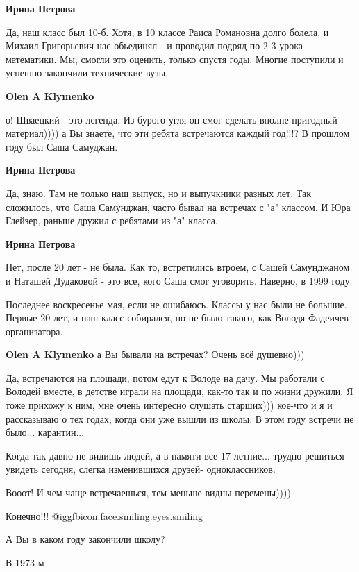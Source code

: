 \textbf{Ирина Петрова} 

Да, наш класс был 10-б. Хотя, в 10 классе Раиса Романовна долго болела, и
Михаил Григорьевич нас обьединял - и проводил подряд по 2-3 урока математики. Мы, 
смогли это оценить, только спустя годы. Многие поступили и успешно закончили
технические вузы.

\textbf{Olen A Klymenko} 

о! Шваецкий - это легенда. Из бурого угля он смог сделать вполне пригодный
материал)))) а Вы знаете, что эти ребята встречаются каждый год!!!? В прошлом
году был Саша Самуджан.

\textbf{Ирина Петрова} 

Да, знаю. Там не только наш выпуск, но и выпучкники разных лет. Так сложилось,
что Саша Самунджан, часто бывал на встречах с "а" классом. И Юра Глейзер,
раньше дружил с ребятами из "а" класса.

\textbf{Ирина Петрова} 

Нет, после 20 лет - не была. Как то, встретились втроем, с Сашей Самунджаном и
Наташей Дудаковой - это все, кого Саша смог уговорить. Наверно, в 1999 году.


Последнее воскресенье мая, если не ошибаюсь. Классы у нас были не большие.
Первые 20 лет, и наш класс собирался, но не было такого, как Володя Фадеичев
организатора.

\textbf{Olen A Klymenko} а Вы бывали на встречах? Очень всё душевно)))


Да, встречаются на площади, потом едут к Володе на дачу. Мы работали с Володей
вместе, в детстве играли на площади, как-то так и по жизни дружили. Я тоже
прихожу к ним, мне очень интересно слушать старших))) кое-что и я и рассказываю
о тех годах, когда они уже вышли из школы. В этом году встречи не
было... карантин...


Когда так давно не видишь людей, а в памяти все 17 летние... трудно решиться
увидеть сегодня, слегка изменившихся друзей- одноклассников.

Вооот! И чем чаще встречаешься, тем меньше видны перемены))))

Конечно!!! @igg{fbicon.face.smiling.eyes.smiling} 

А Вы в каком году закончили школу?

В 1973 м
